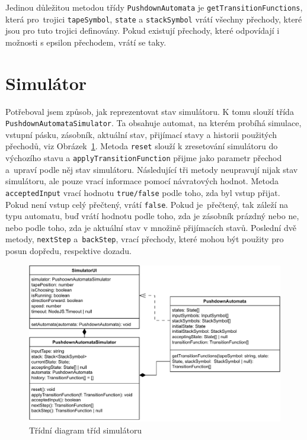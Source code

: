 Jedinou důležitou metodou třídy \texttt{PushdownAutomata} je \texttt{getTransitionFunctions}, která pro~trojici \texttt{tapeSymbol}, \texttt{state} a \texttt{stackSymbol} vrátí všechny přechody, které jsou pro tuto trojici definovány. Pokud existují přechody, které odpovídají i možnosti s epsilon přechodem, vrátí se taky.

\section{Simulátor}

Potřeboval jsem způsob, jak reprezentovat stav simulátoru. K tomu slouží třída \texttt{PushdownAutomataSimulator}. Ta obsahuje automat, na kterém probíhá simulace, vstupní pásku, zásobník, aktuální stav, přijímací stavy a historii použitých přechodů, viz Obrázek~\ref{fig:SimulatorClasses}. Metoda \texttt{reset} slouží k zresetování simulátoru do výchozího stavu a \texttt{applyTransitionFunction} přijme jako parametr přechod a~upraví podle něj stav simulátoru. Následující tři metody neupravují nijak stav simulátoru, ale pouze vrací informace pomocí návratových hodnot. Metoda \texttt{acceptedInput} vrací hodnotu \texttt{true/false} podle toho, zda byl vstup přijat. Pokud není vstup celý přečtený, vrátí \texttt{false}. Pokud je~přečtený, tak záleží na typu automatu, buď vrátí hodnotu podle toho, zda je zásobník prázdný nebo ne, nebo podle toho, zda je aktuální stav v množině přijímacích stavů.
Poslední dvě metody, \texttt{nextStep} a~\texttt{backStep}, vrací přechody, které mohou být použity pro posun dopředu, respektive dozadu.

\begin{figure}[h]
    \centering
    \includegraphics[width=\textwidth]{Figures/SimulatorClasses.drawio.pdf}
    \caption{Třídní diagram tříd simulátoru}\label{fig:SimulatorClasses}
\end{figure}

